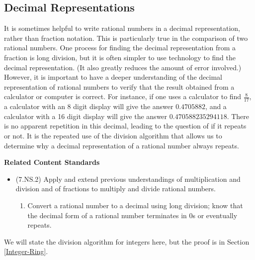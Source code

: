 \documentclass[
]{book}
\providecommand{\tightlist}{%
  \setlength{\itemsep}{0pt}\setlength{\parskip}{0pt}}
\newenvironment{standards}{}{}
\theoremstyle{definition}
\theoremstyle{definition}
\theoremstyle{definition}
\theoremstyle{definition}
\theoremstyle{remark}
\begin{document}
\hypertarget{decimal-representations}{%
\subsection{Decimal Representations}\label{decimal-representations}}

It is sometimes helpful to write rational numbers in a decimal representation, rather than fraction notation. This is particularly true in the comparison of two rational numbers. One process for finding the decimal representation from a fraction is long division, but it is often simpler to use technology to find the decimal representation. (It also greatly reduces the amount of error involved.) However, it is important to have a deeper understanding of the decimal representation of rational numbers to verify that the result obtained from a calculator or computer is correct. For instance, if one uses a calculator to find \(\frac{8}{17}\), a calculator with an 8 digit display will give the answer \(0.4705882\), and a calculator with a 16 digit display will give the answer \(0.470588235294118\). There is no apparent repetition in this decimal, leading to the question of if it repeats or not. It is the repeated use of the division algorithm that allows us to determine why a decimal representation of a rational number always repeats.

\begin{standards}

\begin{center}
\textbf{Related Content Standards}

\end{center}

\begin{itemize}
\tightlist
\item
  (7.NS.2) Apply and extend previous understandings of multiplication and division and of fractions to multiply and divide rational numbers.

  \begin{enumerate}
  \def\labelenumi{\alph{enumi}.}
  \setcounter{enumi}{3}
  \tightlist
  \item
    Convert a rational number to a decimal using long division; know that the decimal form of a rational number terminates in 0s or eventually repeats.
  \end{enumerate}
\end{itemize}

\end{standards}

We will state the division algorithm for integers here, but the proof is in Section \ref{Integer-Ring}.
\end{document}
